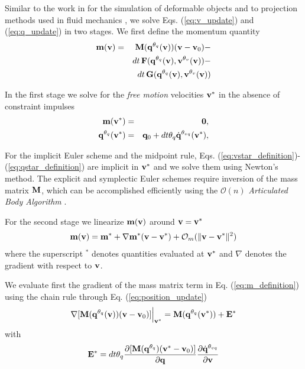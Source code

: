 Similar to the work in \cite{bib:duriez2005realistic} for the simulation of
deformable objects and to projection methods used in fluid mechanics
\cite{bib::bell1991efficient}, we solve Eqs. (\ref{eq:v_update}) and
(\ref{eq:q_update}) in two stages. We first define the momentum quantity
\begin{eqnarray}
	\mf{m}(\mf{v}) &=&
	\mf{M}(\mf{q}^{\theta_{q}}(\mf{v}))(\mf{v}-\mf{v}_0) - \nonumber\\
	&&dt\,\mf{F}(\mf{q}^{\theta_{q}}(\mf{v}), \mf{v}^{\theta_v}(\mf{v}))-\nonumber\\
	&&dt\,\mf{G}(\mf{q}^{\theta_{q}}(\mf{v}), \mf{v}^{\theta_v}(\mf{v}))
	\label{eq:m_definition}
\end{eqnarray}

In the first stage we solve for the
\textit{free motion} velocities ${\mathbf{v}}^*$ in the absence of constraint impulses
\begin{eqnarray}
	\mf{m}(\mf{v}^*) &=& \mf{0},
	\label{eq:vstar_definition}\\
	\mf{q}^{\theta_q}(\mf{v}^*) &=& \mf{q}_0 + dt\theta_q\dot{\mf{q}}^{\theta_{vq}}(\mf{v}^*),
	\label{eq:qstar_definition}
\end{eqnarray}

For the implicit Euler scheme and the midpoint rule, Eqs.
(\ref{eq:vstar_definition})-(\ref{eq:qstar_definition}) are implicit in
${\mathbf{v}}^*$ and we solve them using Newton's method. The explicit and symplectic
Euler schemes require inversion of the mass matrix ${\mathbf{M}}$, which can be
accomplished efficiently using the $\mathcal{O}(n)$
\emph{Articulated Body Algorithm}
\cite{bib:featherstone2008_rigid_body_dynamics_algorithms}.

For the second stage we linearize ${\mathbf{m}}({\mathbf{v}})$ around ${\mathbf{v}} = {\mathbf{v}}^*$ 
\begin{eqnarray}
	\mf{m}(\mf{v}) = \mf{m}^* +
	\nabla\mf{m}^*(\mf{v}-\mf{v}^*) + \mathcal{O}_m(\Vert\mf{v}-\mf{v}^*\Vert^2)
	\label{eq:m_taylor_expansion}
\end{eqnarray}
where the superscript $^*$ denotes quantities evaluated at ${\mathbf{v}}^*$ and
$\nabla$ denotes the gradient with respect to ${\mathbf{v}}$.

We evaluate first the gradient of the mass matrix term in Eq.
(\ref{eq:m_definition}) using the chain rule through Eq.
(\ref{eq:position_update})
\begin{eqnarray}
	\nabla[{\mathbf{M}}({\mathbf{q}}^{\theta_{q}}({\mathbf{v}}))({\mathbf{v}}-{\mathbf{v}}_0)]\Bigr|_{{\mathbf{v}}^*}
	= {\mathbf{M}}({\mathbf{q}}^{\theta_{q}}({\mathbf{v}}^*)) + {\mathbf{E}}^*
\end{eqnarray}
with
\begin{eqnarray}
	\mf{E}^* =
	dt\theta_q\frac{\partial[\mf{M}(\mf{q}^{\theta_{q}})(\mf{v}^*-\mf{v}_0)]}{\partial\mf{q}}\frac{\partial\dot{\mf{q}}^{\theta_{vq}}}{\partial\mf{v}}
	\label{eq:E_definition}
\end{eqnarray}

